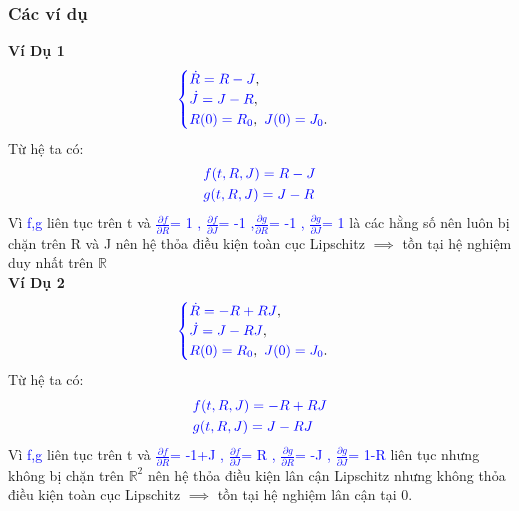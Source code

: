 \documentclass[a4paper]{article}
\begin{document}
    \subsubsection{Các ví dụ }
    \textbf{Ví Dụ 1} 
 \begin{align}
	    \textcolor{blue}{
	    \begin{cases}
            \dot R = R-J\textcolor{black}{,}\\
            \dot J =  J-R\textcolor{black}{,}\\
            R(0) = R_0\textcolor{black}{,} \enskip J(0) = J_0 \textcolor{black}{.}
        \end{cases}
        }
        \label{label9}
	\end{align}
 Từ hệ ta có:
 \begin{align}
    &\textcolor{blue}{ f(t,R,J)= R-J}\\& \textcolor{blue}{ g(t,R,J)=J-R}
 \end{align}
 Vì \textcolor{blue}{f,g} liên tục trên t và \textcolor{blue}{$\frac{\partial f}{\partial R}$= 1 , $\frac{\partial f}{\partial J}$= -1 ,$\frac{\partial g}{\partial R}$= -1 , $\frac{\partial g}{\partial J}$= 1} là các hằng số nên luôn bị chặn trên R và J nên hệ thỏa điều kiện toàn cục Lipschitz $\implies$ tồn tại hệ nghiệm duy nhất trên $\mathbb{R}$\\
    \textbf{Ví Dụ 2} 
 \begin{align}
	    \textcolor{blue}{
	    \begin{cases}
            \dot R = -R+RJ\textcolor{black}{,}\\
            \dot J =  J-RJ\textcolor{black}{,}\\
            R(0) = R_0\textcolor{black}{,} \enskip J(0) = J_0 \textcolor{black}{.}
        \end{cases}
        }
        \label{label9}
	\end{align}
 Từ hệ ta có:
 \begin{align}
    &\textcolor{blue}{ f(t,R,J)= -R+RJ}\\& \textcolor{blue}{ g(t,R,J)=J-RJ}
 \end{align}
  Vì \textcolor{blue}{f,g} liên tục trên t và \textcolor{blue}{$\frac{\partial f}{\partial R}$= -1+J ,  $\frac{\partial f}{\partial J}$= R , $\frac{\partial g}{\partial R}$= -J , $\frac{\partial g}{\partial J}$= 1-R}  liên tục nhưng không bị chặn trên $\mathbb{R}^{2}$ nên hệ thỏa điều kiện lân cận Lipschitz nhưng không thỏa điều kiện toàn cục Lipschitz $\implies$ tồn tại hệ nghiệm lân cận tại 0.\\
\end{document}
